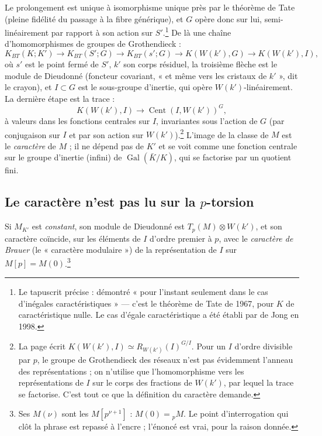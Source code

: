 \documentclass[11pt,a4paper]{article}
\begin{document}
Le prolongement est unique à isomorphisme unique près par le théorème de Tate
(pleine fidélité du passage à la fibre générique), et $G$ opère donc sur lui,
semi-linéairement par rapport à son action sur $S'$.\footnote{Le tapuscrit
précise : démontré « pour l'instant seulement dans le cas d'inégales
caractéristiques » --- c'est le théorème de Tate de 1967, pour $K$ de
caractéristique nulle. Le cas d'égale caractéristique a été établi par de
Jong en 1998.} De là une chaîne d'homomorphismes de groupes de Grothendieck :
\[
K_{BT}(K; K') \to K_{BT}(S'; G) \to K_{BT}(s'; G) \to K(W(k'), G) \to
K(W(k'), I) ,
\]
où $s'$ est le point fermé de $S'$, $k'$ son corps résiduel, la troisième
flèche est le module de Dieudonné (foncteur covariant, « et même vers les
cristaux de $k'$ », dit le crayon), et $I \subset G$ est le sous-groupe
d'inertie, qui opère $W(k')$-linéairement. La dernière étape est la trace :
\[
K(W(k'), I) \to \operatorname{Cent}(I, W(k'))^{G} ,
\]
à valeurs dans les fonctions centrales sur $I$, invariantes sous l'action de
$G$ (par conjugaison sur $I$ et par son action sur $W(k')$).\footnote{La page
écrit $K(W(k'), I) \simeq R_{W(k')}(I)^{G/I}$. Pour un $I$ d'ordre divisible
par $p$, le groupe de Grothendieck des réseaux n'est pas évidemment l'anneau des
représentations ; on n'utilise que l'homomorphisme vers les représentations
de $I$ sur le corps des fractions de $W(k')$, par lequel la trace se
factorise. C'est tout ce que la définition du caractère demande.} L'image de
la classe de $M$ est le \emph{caractère} de $M$ ; il ne dépend pas de $K'$ et
se voit comme une fonction centrale sur le groupe d'inertie (infini) de
$\operatorname{Gal}(\bar K/K)$, qui se factorise par un quotient fini.

\subsection*{Le caractère n'est pas lu sur la $p$-torsion}

Si $M_{K'}$ est \emph{constant}, son module de Dieudonné est $T_p(M) \otimes
W(k')$, et son caractère coïncide, sur les éléments de $I$ d'ordre premier à
$p$, avec le \emph{caractère de Brauer} (le « caractère modulaire ») de la
représentation de $I$ sur $M[p] = M(0)$.\footnote{Ses $M(\nu)$ sont les
$M[p^{\nu+1}]$ : $M(0) = {}_pM$. Le point d'interrogation qui clôt la phrase
est repassé à l'encre ; l'énoncé est vrai, pour la raison donnée.}
\end{document}
